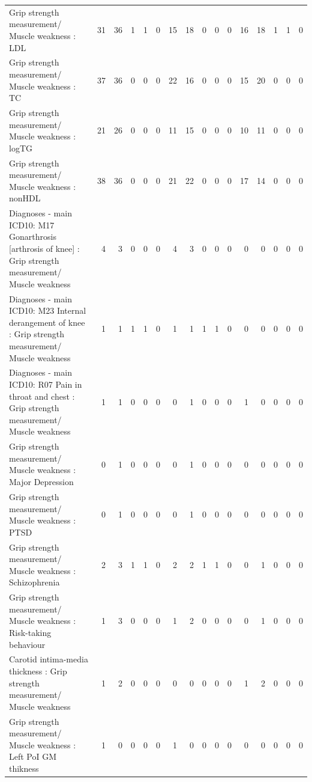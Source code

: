 \begin{table}[ht]
\begin{tabular}{lrrrrrrrrrrrrrrr}
  Grip strength measurement/ Muscle weakness : LDL &  31 &  36 &   1 &   1 &   0 &  15 &  18 &   0 &   0 &   0 &  16 &  18 &   1 &   1 &   0 \\ 
  Grip strength measurement/ Muscle weakness : TC &  37 &  36 &   0 &   0 &   0 &  22 &  16 &   0 &   0 &   0 &  15 &  20 &   0 &   0 &   0 \\ 
  Grip strength measurement/ Muscle weakness : logTG &  21 &  26 &   0 &   0 &   0 &  11 &  15 &   0 &   0 &   0 &  10 &  11 &   0 &   0 &   0 \\ 
  Grip strength measurement/ Muscle weakness : nonHDL &  38 &  36 &   0 &   0 &   0 &  21 &  22 &   0 &   0 &   0 &  17 &  14 &   0 &   0 &   0 \\ 
  Diagnoses - main ICD10: M17 Gonarthrosis [arthrosis of knee] : Grip strength measurement/ Muscle weakness &   4 &   3 &   0 &   0 &   0 &   4 &   3 &   0 &   0 &   0 &   0 &   0 &   0 &   0 &   0 \\ 
  Diagnoses - main ICD10: M23 Internal derangement of knee : Grip strength measurement/ Muscle weakness &   1 &   1 &   1 &   1 &   0 &   1 &   1 &   1 &   1 &   0 &   0 &   0 &   0 &   0 &   0 \\ 
  Diagnoses - main ICD10: R07 Pain in throat and chest : Grip strength measurement/ Muscle weakness &   1 &   1 &   0 &   0 &   0 &   0 &   1 &   0 &   0 &   0 &   1 &   0 &   0 &   0 &   0 \\ 
  Grip strength measurement/ Muscle weakness : Major Depression &   0 &   1 &   0 &   0 &   0 &   0 &   1 &   0 &   0 &   0 &   0 &   0 &   0 &   0 &   0 \\ 
  Grip strength measurement/ Muscle weakness : PTSD &   0 &   1 &   0 &   0 &   0 &   0 &   1 &   0 &   0 &   0 &   0 &   0 &   0 &   0 &   0 \\ 
  Grip strength measurement/ Muscle weakness : Schizophrenia &   2 &   3 &   1 &   1 &   0 &   2 &   2 &   1 &   1 &   0 &   0 &   1 &   0 &   0 &   0 \\ 
  Grip strength measurement/ Muscle weakness : Risk-taking behaviour &   1 &   3 &   0 &   0 &   0 &   1 &   2 &   0 &   0 &   0 &   0 &   1 &   0 &   0 &   0 \\ 
  Carotid intima-media thickness : Grip strength measurement/ Muscle weakness &   1 &   2 &   0 &   0 &   0 &   0 &   0 &   0 &   0 &   0 &   1 &   2 &   0 &   0 &   0 \\ 
  Grip strength measurement/ Muscle weakness : Left PoI GM thikness &   1 &   0 &   0 &   0 &   0 &   1 &   0 &   0 &   0 &   0 &   0 &   0 &   0 &   0 &   0 \\ 

\end{tabular}
\end{table}
